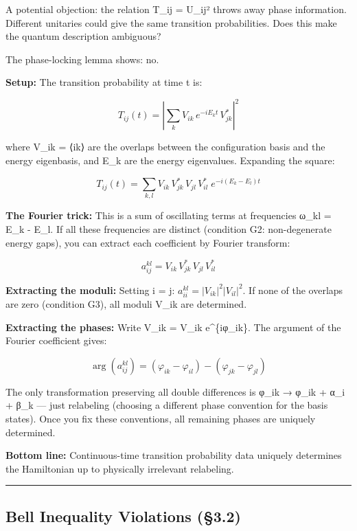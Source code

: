 \documentclass[
]{article}
\begin{document}
A potential objection: the relation T\_ij = \textbar U\_ij\textbar²
throws away phase information. Different unitaries could give the same
transition probabilities. Does this make the quantum description
ambiguous?

The phase-locking lemma shows: no.

\textbf{Setup:} The transition probability at time t is:

\[T_{ij}(t) = \left|\sum_k V_{ik} \, e^{-iE_k t} \, V_{jk}^*\right|^2\]

where V\_ik = ⟨i\textbar k⟩ are the overlaps between the configuration
basis and the energy eigenbasis, and E\_k are the energy eigenvalues.
Expanding the square:

\[T_{ij}(t) = \sum_{k,l} V_{ik}\, V_{jk}^*\, V_{jl}\, V_{il}^*\; e^{-i(E_k - E_l)t}\]

\textbf{The Fourier trick:} This is a sum of oscillating terms at
frequencies ω\_kl = E\_k - E\_l. If all these frequencies are distinct
(condition G2: non-degenerate energy gaps), you can extract each
coefficient by Fourier transform:

\[a_{ij}^{kl} = V_{ik}\, V_{jk}^*\, V_{jl}\, V_{il}^*\]

\textbf{Extracting the moduli:} Setting i = j:
\(a_{ii}^{kl} = |V_{ik}|^2 |V_{il}|^2\). If none of the overlaps are
zero (condition G3), all moduli \textbar V\_ik\textbar{} are determined.

\textbf{Extracting the phases:} Write V\_ik = \textbar V\_ik\textbar{}
e\^{}\{iφ\_ik\}. The argument of the Fourier coefficient gives:

\[\arg(a_{ij}^{kl}) = (\varphi_{ik} - \varphi_{il}) - (\varphi_{jk} - \varphi_{jl})\]

The only transformation preserving all double differences is φ\_ik →
φ\_ik + α\_i + β\_k --- just relabeling (choosing a different phase
convention for the basis states). Once you fix these conventions, all
remaining phases are uniquely determined.

\textbf{Bottom line:} Continuous-time transition probability data
uniquely determines the Hamiltonian up to physically irrelevant
relabeling.

\begin{center}\rule{0.5\linewidth}{0.5pt}\end{center}

\hypertarget{bell-inequality-violations-3.2}{%
\subsection{Bell Inequality Violations
(§3.2)}\label{bell-inequality-violations-3.2}}
\end{document}
